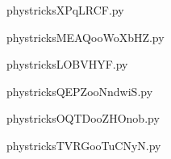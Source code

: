    \newcommand{\CaptionFigXPqLRCF}{<+Type your caption here+>}
    \begin{center}
        
    \end{center}
    phystricksXPqLRCF.py

    

    \clearpage
    


    \newcommand{\CaptionFigMEAQooWoXbHZ}{<+Type your caption here+>}
    \begin{center}
        
    \end{center}
    phystricksMEAQooWoXbHZ.py

    

    \clearpage
    


    \newcommand{\CaptionFigLOBVHYF}{<+Type your caption here+>}
    \begin{center}
        
    \end{center}
    phystricksLOBVHYF.py

    

    \clearpage
    


    \newcommand{\CaptionFigQEPZooNndwiS}{<+Type your caption here+>}
    \begin{center}
        
    \end{center}
    phystricksQEPZooNndwiS.py

    

    \clearpage
    


    \newcommand{\CaptionFigOQTDooZHOnob}{<+Type your caption here+>}
    \begin{center}
        
    \end{center}
    phystricksOQTDooZHOnob.py

    

    \clearpage
    


    \newcommand{\CaptionFigTVRGooTuCNyN}{<+Type your caption here+>}
    \begin{center}
        
    \end{center}
    phystricksTVRGooTuCNyN.py

